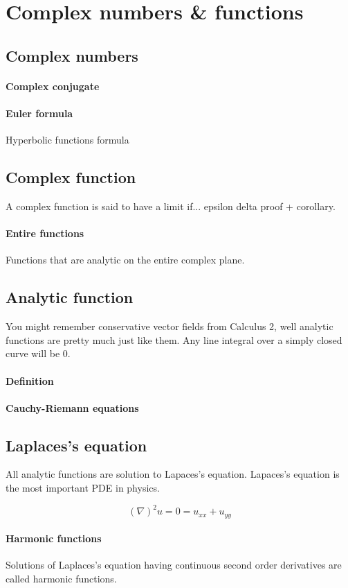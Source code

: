 \section{Complex numbers \& functions}

\subsection{Complex numbers}

\paragraph{Complex conjugate}
\paragraph{Euler formula}

Hyperbolic functions formula

\subsection{Complex function}
A complex function is said to have a limit if... epsilon delta proof
+ corollary.

\paragraph{Entire functions}
Functions that are analytic on the entire complex plane.


\subsection{Analytic function}
You might remember conservative vector fields from Calculus 2, well analytic
functions are pretty much just like them. Any line integral over a
simply closed curve will be 0.

\paragraph{Definition}

\paragraph{Cauchy-Riemann equations}

\subsection{Laplaces's equation}
All analytic functions are solution to Lapaces's equation. Lapaces's
equation is the most important PDE in physics.

\begin{equation}
  (\nabla)^2 u = 0 =u_{xx}+ u_{yy}
\end{equation}

\paragraph{Harmonic functions} Solutions of Laplaces's equation having
continuous second order derivatives are called harmonic functions.
